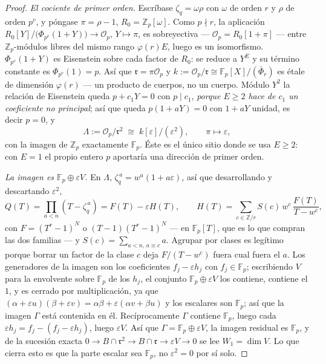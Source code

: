 \documentclass[11pt,a4paper]{article}
\theoremstyle{definition}
\newcommand{\ZZ}{\mathbb{Z}}
\newcommand{\FF}{\mathbb{F}}
\newcommand{\cO}{\mathcal{O}}
\newcommand{\rad}{\mathfrak{r}}
\begin{document}
\begin{proof}
\emph{El cociente de primer orden.} Escr\'ibase $\zeta_q=\omega\rho$ con $\omega$ de orden $r$ y
$\rho$ de orden $p^v$, y p\'ongase $\pi=\rho-1$, $R_0=\ZZ_p[\omega]$. Como $p\nmid r$, la
aplicaci\'on $R_0[Y]/\bigl(\Phi_{p^v}(1+Y)\bigr)\to\cO_p$, $Y\mapsto\pi$, es sobreyectiva ---
$\cO_p=R_0[1+\pi]$ --- entre $\ZZ_p$-m\'odulos libres del mismo rango $\varphi(r)E$, luego es un
isomorfismo. $\Phi_{p^v}(1+Y)$ es Eisenstein sobre cada factor de $R_0$: se reduce a $Y^E$ y su
t\'ermino constante es $\Phi_{p^v}(1)=p$. As\'i que $\rad=\pi\cO_p$ y
$k:=\cO_p/\rad\cong\FF_p[X]/(\bar\Phi_r)$ es \'etale de dimensi\'on $\varphi(r)$ --- un producto de
cuerpos, no un cuerpo. M\'odulo $Y^2$ la relaci\'on de Eisenstein queda $p+c_1Y=0$ con $p\mid c_1$,
\emph{porque $E\ge2$ hace de $c_1$ un coeficiente no principal}; as\'i que queda $p(1+aY)=0$ con
$1+aY$ unidad, es decir $p=0$, y
\[
\Lambda:=\cO_p/\rad^2\;\cong\;k[\varepsilon]/(\varepsilon^2),\qquad\pi\mapsto\varepsilon,
\]
con la imagen de $\ZZ_p$ exactamente $\FF_p$. \'Este es el \'unico sitio donde se usa $E\ge2$: con
$E=1$ el propio entero $p$ aportar\'ia una direcci\'on de primer orden.

\emph{La imagen es $\FF_p\oplus\varepsilon V$.} En $\Lambda$,
$\zeta_q^{\,a}=w^a(1+a\varepsilon)$, as\'i que desarrollando y descartando $\varepsilon^2$,
\[
Q(T)=\prod_{a<n}(T-\zeta_q^{\,a})=F(T)-\varepsilon H(T),\qquad
H(T)=\sum_{c\in\ZZ/r}S(c)\,w^c\,\frac{F(T)}{T-w^c},
\]
con $F=(T^r-1)^N$ o $(T-1)(T^r-1)^N$ --- en $\FF_p[T]$, que es lo que compran las dos familias --- y
$S(c)=\sum_{a<n,\,a\equiv c}a$. Agrupar por clases es leg\'itimo porque borrar un factor de la
clase $c$ deja $F/(T-w^c)$ fuera cual fuera el $a$. Los generadores de la imagen son los
coeficientes $f_j-\varepsilon h_j$ con $f_j\in\FF_p$; escribiendo $V$ para la envolvente sobre
$\FF_p$ de los $h_j$, el conjunto $\FF_p\oplus\varepsilon V$ los contiene, contiene el $1$, y es
cerrado por multiplicaci\'on, ya que
$(\alpha+\varepsilon u)(\beta+\varepsilon v)=\alpha\beta+\varepsilon(\alpha v+\beta u)$ y los
escalares son $\FF_p$; as\'i que la imagen $\Gamma$ est\'a contenida en \'el. Rec\'iprocamente
$\Gamma$ contiene $\FF_p$, luego cada $\varepsilon h_j=f_j-(f_j-\varepsilon h_j)$, luego
$\varepsilon V$. As\'i que $\Gamma=\FF_p\oplus\varepsilon V$, la imagen residual es $\FF_p$, y de
la sucesi\'on exacta $0\to B\cap\rad^2\to B\cap\rad\to\varepsilon V\to0$ se lee $W_1=\dim V$. Lo
que cierra esto es que la parte escalar sea $\FF_p$, no $\varepsilon^2=0$ por s\'i solo.


\end{proof}
\end{document}
